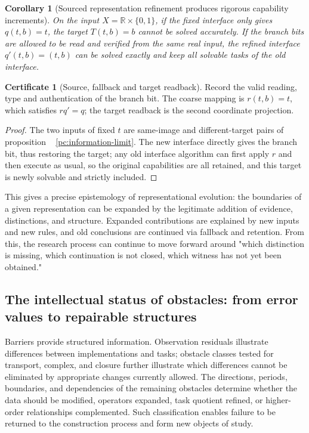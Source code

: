 \documentclass[11pt,a4paper]{article}
\theoremstyle{plain}
\newtheorem{corollary}[theorem]{Corollary}
\theoremstyle{definition}
\newtheorem*{certificate}{Certificate}
\theoremstyle{remark}
\begin{document}
\begin{CJK*}
\begin{corollary}
[Sourced representation refinement produces rigorous capability increments]\label{pc:capability}
On the input $X=\mathbb R\times\{0,1\}$, if the fixed interface only gives $q(t,b)=t$, the target $T(t,b)=b$ cannot be solved accurately. If the branch bits are allowed to be read and verified from the same real input, the refined interface $q'(t,b)=(t,b)$ can be solved exactly and keep all solvable tasks of the old interface.\end{corollary}
\begin{certificate}
[Source, fallback and target readback]Record the valid reading, type and authentication of the branch bit. The coarse mapping is $r(t,b)=t$, which satisfies $rq'=q$; the target readback is the second coordinate projection.\end{certificate}
\begin{proof}
The two inputs of fixed $t$ are same-image and different-target pairs of proposition ~ \ref{pc:information-limit}. The new interface directly gives the branch bit, thus restoring the target; any old interface algorithm can first apply $r$ and then execute as usual, so the original capabilities are all retained, and this target is newly solvable and strictly included.\end{proof}


This gives a precise epistemology of representational evolution: the boundaries of a given representation can be expanded by the legitimate addition of evidence, distinctions, and structure. Expanded contributions are explained by new inputs and new rules, and old conclusions are continued via fallback and retention. From this, the research process can continue to move forward around "which distinction is missing, which continuation is not closed, which witness has not yet been obtained."

\subsection { The intellectual status of obstacles: from error values to repairable structures }

Barriers provide structured information. Observation residuals illustrate differences between implementations and tasks; obstacle classes tested for transport, complex, and closure further illustrate which differences cannot be eliminated by appropriate changes currently allowed. The directions, periods, boundaries, and dependencies of the remaining obstacles determine whether the data should be modified, operators expanded, task quotient refined, or higher-order relationships complemented. Such classification enables failure to be returned to the construction process and form new objects of study.


\end{CJK*}
\end{document}
